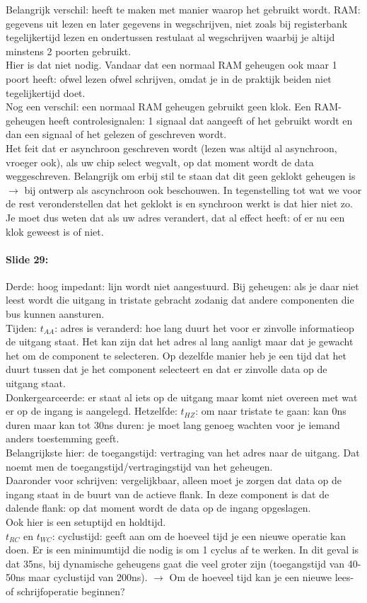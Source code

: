\documentclass[10pt,a4paper]{book}
\begin{document}
Belangrijk verschil: heeft te maken met manier waarop het gebruikt wordt. RAM: gegevens uit lezen en later gegevens in wegschrijven, niet zoals bij registerbank tegelijkertijd lezen en ondertussen restulaat al wegschrijven waarbij je altijd minstens 2 poorten gebruikt.\\
Hier is dat niet nodig. Vandaar dat een normaal RAM geheugen ook maar 1 poort heeft: ofwel lezen ofwel schrijven, omdat je in de praktijk beiden niet tegelijkertijd doet.\\
Nog een verschil: een normaal RAM geheugen gebruikt geen klok. Een RAM-geheugen heeft controlesignalen: 1 signaal dat aangeeft of het gebruikt wordt en dan een signaal of het gelezen of geschreven wordt.\\
Het feit dat er asynchroon geschreven wordt (lezen was altijd al asynchroon, vroeger ook), als uw chip select wegvalt, op dat moment wordt de data weggeschreven. Belangrijk om erbij stil te staan dat dit geen geklokt geheugen is $\rightarrow$ bij ontwerp als ascynchroon ook beschouwen. In tegenstelling tot wat we voor de rest veronderstellen dat het geklokt is en synchroon werkt is dat hier niet zo. Je moet dus weten dat als uw adres verandert, dat al effect heeft: of er nu een klok geweest is of niet. 

\paragraph{Slide 29:} Derde: hoog impedant: lijn wordt niet aangestuurd. Bij geheugen: als je daar niet leest wordt die uitgang in tristate gebracht zodanig dat andere componenten die bus kunnen aansturen.\\
Tijden: $t_{AA}$: adres is veranderd: hoe lang duurt het voor er zinvolle informatieop de uitgang staat. Het kan zijn dat het adres al lang aanligt maar dat je gewacht het om de component te selecteren. Op dezelfde manier heb je een tijd dat het duurt tussen dat je het component selecteert en dat er zinvolle data op de uitgang staat.\\
Donkergearceerde: er staat al iets op de uitgang maar komt niet overeen met wat er op de ingang is aangelegd. Hetzelfde: $t_{HZ}$: om naar tristate te gaan: kan 0ns duren maar kan tot 30ns duren: je moet lang genoeg wachten voor je iemand anders toestemming geeft.\\
Belangrijkste hier: de toegangstijd: vertraging van het adres naar de uitgang. Dat noemt men de toegangstijd/vertragingstijd van het geheugen.\\
Daaronder voor schrijven: vergelijkbaar, alleen moet je zorgen dat data op de ingang staat in de buurt van de actieve flank. In deze component is dat de dalende flank: op dat moment wordt de data op de ingang opgeslagen.\\
Ook hier is een setuptijd en holdtijd.\\
$t_{RC}$ en $t_{WC}$: cyclustijd: geeft aan om de hoeveel tijd je een nieuwe operatie kan doen. Er is een minimumtijd die nodig is om 1 cyclus af te werken. In dit geval is dat 35ns, bij dynamische geheugens gaat die veel groter zijn (toegangstijd van 40-50ns maar cyclustijd van 200ns). $\rightarrow$ Om de hoeveel tijd kan je een nieuwe lees- of schrijfoperatie beginnen?
\end{document}
